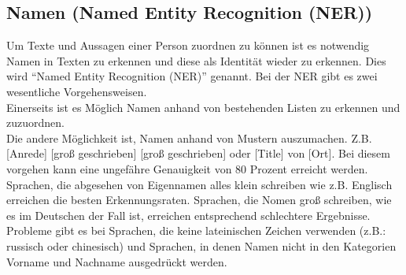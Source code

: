\documentclass[twoside,a4paper]{article}
\begin{document}
\subsection{Namen (Named Entity Recognition (NER))}
Um Texte und Aussagen einer Person zuordnen zu können ist es notwendig Namen in Texten zu erkennen und diese als Identität wieder zu erkennen. Dies wird \enquote{Named Entity Recognition (NER)} genannt. Bei der NER gibt es zwei wesentliche Vorgehensweisen. \\
Einerseits ist es Möglich Namen anhand von bestehenden Listen zu erkennen und zuzuordnen.\\
Die andere Möglichkeit ist, Namen anhand von Mustern auszumachen. Z.B. [Anrede] [groß geschrieben] [groß geschrieben] oder [Title] von [Ort]. Bei diesem vorgehen kann eine ungefähre Genauigkeit von 80 Prozent \cite{challanges_in_osint} erreicht werden. Sprachen, die abgesehen von Eigennamen alles klein schreiben wie z.B. Englisch erreichen die besten Erkennungsraten. Sprachen, die Nomen groß schreiben, wie es im Deutschen der Fall ist, erreichen entsprechend schlechtere Ergebnisse. Probleme gibt es bei Sprachen, die keine lateinischen Zeichen verwenden (z.B.: russisch oder chinesisch) und Sprachen, in denen Namen nicht in den Kategorien Vorname und Nachname ausgedrückt werden.
\end{document}
